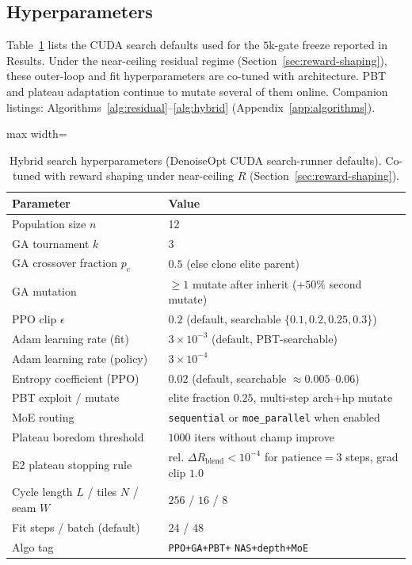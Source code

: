 \subsection{Hyperparameters}
\label{sec:hyperparams}

Table~\ref{tab:hyperparams} lists the CUDA search defaults used for the $5$k-gate freeze reported in Results.
Under the near-ceiling residual regime (Section~\ref{sec:reward-shaping}), these outer-loop and fit hyperparameters are co-tuned with architecture. PBT and plateau adaptation continue to mutate several of them online.
Companion listings: Algorithms~\ref{alg:residual}--\ref{alg:hybrid} (Appendix~\ref{app:algorithms}).

\begin{table}[t]
  \centering
  \small
  \caption{Hybrid search hyperparameters (DenoiseOpt CUDA search-runner defaults). Co-tuned with reward shaping under near-ceiling $R$ (Section~\ref{sec:reward-shaping}).}
  \label{tab:hyperparams}
  \setlength{\tabcolsep}{3pt}
  \begin{adjustbox}{max width=\columnwidth}
\begin{tabular}{@{}lp{}@{}}
    \toprule
    Parameter & Value \\
    \midrule
    Population size $n$ & 12 \\
    GA tournament $k$ & 3 \\
    GA crossover fraction $p_c$ & $0.5$ (else clone elite parent) \\
    GA mutation & $\ge 1$ mutate after inherit ($+50\%$ second mutate) \\
    PPO clip $\epsilon$ & $0.2$ (default, searchable $\{0.1,0.2,0.25,0.3\}$) \\
    Adam learning rate (fit) & $3{\times}10^{-3}$ (default, PBT-searchable) \\
    Adam learning rate (policy) & $3{\times}10^{-4}$ \\
    Entropy coefficient (PPO) & $0.02$ (default, searchable $\approx 0.005$--$0.06$) \\
    PBT exploit / mutate & elite fraction $0.25$, multi-step arch+hp mutate \\
    MoE routing & \texttt{sequential} or \texttt{moe\_parallel} when enabled \\
    Plateau boredom threshold & $1000$ iters without champ improve \\
    E2 plateau stopping rule & $\text{rel.\ }\Delta R_{\mathrm{blend}}<10^{-4}$ for $\text{patience}{=}3$ steps, grad clip $1.0$ \\
    Cycle length $L$ / tiles $N$ / seam $W$ & $256$ / $16$ / $8$ \\
    Fit steps / batch (default) & $24$ / $48$ \\
    Algo tag & \texttt{PPO+GA+PBT+} \texttt{NAS+depth+MoE} \\
    \bottomrule
  \end{tabular}
\end{adjustbox}
\end{table}
